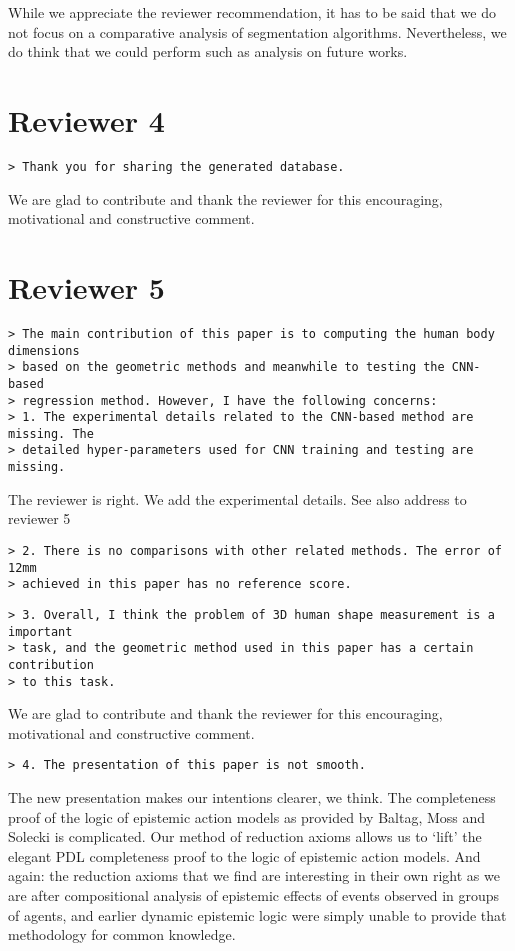\documentclass{article}
\begin{document}
While we appreciate the reviewer recommendation, it has to be said that we do 
not focus on a comparative analysis of segmentation algorithms. Nevertheless, 
we do think that we could perform such as analysis on future works.

\section*{Reviewer 4}
\begin{verbatim}
> Thank you for sharing the generated database.
\end{verbatim} 

We are glad to contribute and thank the reviewer for this encouraging, 
motivational and 
constructive comment.

\section*{Reviewer 5}
\begin{verbatim}
> The main contribution of this paper is to computing the human body dimensions
> based on the geometric methods and meanwhile to testing the CNN-based
> regression method. However, I have the following concerns:
> 1. The experimental details related to the CNN-based method are missing. The
> detailed hyper-parameters used for CNN training and testing are missing.
\end{verbatim}

The reviewer is right. We add the experimental details. See also address to 
reviewer 5

\begin{verbatim}
> 2. There is no comparisons with other related methods. The error of 12mm
> achieved in this paper has no reference score.
\end{verbatim}

\begin{verbatim}
> 3. Overall, I think the problem of 3D human shape measurement is a important
> task, and the geometric method used in this paper has a certain contribution
> to this task.
\end{verbatim}

We are glad to contribute and thank the reviewer for this encouraging, 
motivational and 
constructive comment.

\begin{verbatim}
> 4. The presentation of this paper is not smooth.
\end{verbatim} 


The new presentation makes our intentions clearer, we think.
The completeness proof of the logic of epistemic action models as
provided by Baltag, Moss and Solecki is complicated. Our method of
reduction axioms allows us to `lift' the elegant PDL completeness
proof to the logic of epistemic action models. And again: the
reduction axioms that we find are interesting in their own right
as we are after compositional analysis of epistemic effects of events
observed in groups of agents, and earlier dynamic epistemic logic were
simply unable to provide that methodology for common knowledge.
\end{document}
